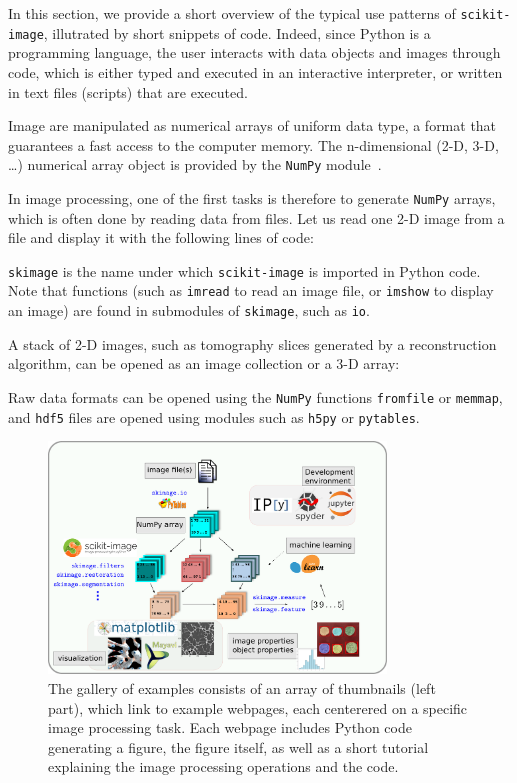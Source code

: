 \documentclass[twocolumn]{bmcart}%
\begin{document}
In this section, we provide a short overview of the typical use patterns of
\texttt{scikit-image}, illutrated by short snippets of code. Indeed, since
Python is a programming language, the user interacts with data objects and
images through code, which is either typed and executed in an interactive
interpreter, or written in text files (scripts) that are executed. 

Image are manipulated as numerical arrays of uniform
data type, a format that guarantees a fast access to the computer memory. The
n-dimensional (2-D, 3-D, \dots) numerical array object is provided by the
\texttt{NumPy} module~\citep{Vanderwalt2011}.

In image processing, one of the first tasks is therefore to generate
\texttt{NumPy} arrays, which is often done by reading data from files. Let us
read one 2-D image from a file and display it with the following lines of code:

 

\texttt{skimage} is the name under which \texttt{scikit-image} is imported in
Python code. Note that functions (such as \texttt{imread} to read an image
file, or \texttt{imshow} to display an image) are found in submodules of
\texttt{skimage}, such as \texttt{io}. 

A stack of 2-D images, such as tomography slices generated by a reconstruction algorithm, can be opened as an image collection or a 3-D array:

Raw data formats can be opened using the \texttt{NumPy} functions \texttt{fromfile} or \texttt{memmap}, and \texttt{hdf5} files are opened using modules such as \texttt{h5py} or \texttt{pytables}.

\begin{figure}
    \centerline{\includegraphics[width=0.8\textwidth]{ecosystem_landscape}}
\caption{
 The gallery of examples consists of an array of thumbnails (left part),
 which link to example webpages, each centerered on a specific image
 processing task. Each webpage includes Python code generating a figure,
 the figure itself, as well as a short tutorial explaining the image
 processing operations and the code. \label{fig:ecosystem}}
\end{figure}
\end{document}
